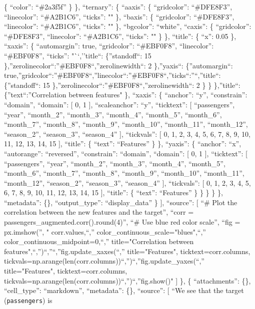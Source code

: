 \documentclass[
]{article}
\begin{document}
\{ ``color'': ``\#2a3f5f'' \} \}, ``ternary'': \{ ``aaxis'': \{
``gridcolor'': ``\#DFE8F3'', ``linecolor'': ``\#A2B1C6'', ``ticks'': ""
\}, ``baxis'': \{ ``gridcolor'': ``\#DFE8F3'', ``linecolor'':
``\#A2B1C6'', ``ticks'': "" \}, ``bgcolor'': ``white'', ``caxis'': \{
``gridcolor'': ``\#DFE8F3'', ``linecolor'': ``\#A2B1C6'', ``ticks'': ""
\} \}, ``title'': \{ ``x'': 0.05 \}, ``xaxis'': \{ ``automargin'': true,
``gridcolor'': ``\#EBF0F8'', ``linecolor'': ``\#EBF0F8'', ``ticks'':
"``,''title``: \{''standoff``: 15
\},''zerolinecolor``:''\#EBF0F8``,''zerolinewidth``: 2 \},''yaxis``:
\{''automargin``:
true,''gridcolor``:''\#EBF0F8``,''linecolor``:''\#EBF0F8``,''ticks``:''``,''title``:
\{''standoff``: 15 \},''zerolinecolor``:''\#EBF0F8``,''zerolinewidth``:
2 \} \} \},''title``: \{''text``:''Correlation between features" \},
``xaxis'': \{ ``anchor'': ``y'', ``constrain'': ``domain'', ``domain'':
{[} 0, 1 {]}, ``scaleanchor'': ``y'', ``ticktext'': {[} ``passengers'',
``year'', ``month\_2'', ``month\_3'', ``month\_4'', ``month\_5'',
``month\_6'', ``month\_7'', ``month\_8'', ``month\_9'', ``month\_10'',
``month\_11'', ``month\_12'', ``season\_2'', ``season\_3'',
``season\_4'' {]}, ``tickvals'': {[} 0, 1, 2, 3, 4, 5, 6, 7, 8, 9, 10,
11, 12, 13, 14, 15 {]}, ``title'': \{ ``text'': ``Features'' \} \},
``yaxis'': \{ ``anchor'': ``x'', ``autorange'': ``reversed'',
``constrain'': ``domain'', ``domain'': {[} 0, 1 {]}, ``ticktext'': {[}
``passengers'', ``year'', ``month\_2'', ``month\_3'', ``month\_4'',
``month\_5'', ``month\_6'', ``month\_7'', ``month\_8'', ``month\_9'',
``month\_10'', ``month\_11'', ``month\_12'', ``season\_2'',
``season\_3'', ``season\_4'' {]}, ``tickvals'': {[} 0, 1, 2, 3, 4, 5, 6,
7, 8, 9, 10, 11, 12, 13, 14, 15 {]}, ``title'': \{ ``text'':
``Features'' \} \} \} \} \}, ``metadata'': \{\}, ``output\_type'':
``display\_data'' \} {]}, ``source'': {[} ``\# Plot the correlation
between the new features and the target\n'', ``corr =
passengers\_augmented.corr().round(4)\n'', ``\# Use blue red color
scale\n'', ``fig = px.imshow(\n'', " corr.values,\n``,''
color\_continuous\_scale="blues",\n``,''
color\_continuous\_midpoint=0,\n``,'' title="Correlation between
features",\n``,'')\n``,''\n``,''fig.update\_xaxes(\n``,''
title="Features", ticktext=corr.columns,
tickvals=np.arange(len(corr.columns))\n``,'')\n``,''fig.update\_yaxes(\n``,''
title="Features", ticktext=corr.columns,
tickvals=np.arange(len(corr.columns))\n``,'')\n``,''fig.show()" {]} \},
\{ ``attachments'': \{\}, ``cell\_type'': ``markdown'', ``metadata'':
\{\}, ``source'': {[} ``We see that the target (\texttt{passengers}) is
\end{document}

